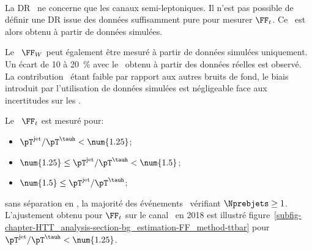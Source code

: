 \paragraph{\ttbar}
La DR \ttbar\ ne concerne que les canaux semi-leptoniques.
Il n'est pas possible de définir une DR issue des données suffisamment pure pour mesurer $\FF_t$.
Ce \fakefactor\ est alors obtenu à partir de données simulées.
\par
Le \fakefactor\ $\FF_W$ peut également être mesuré à partir de données simulées uniquement.
Un écart de \num{10} à \SI{20}{\%} avec le \fakefactor\ obtenu à partir des données réelles est observé.
La contribution \ttbar\ étant faible par rapport aux autres bruits de fond, le biais introduit par l'utilisation de données simulées est négligeable face aux incertitudes sur les \fakefactors.
\par
Le \fakefactor\ $\FF_t$ est mesuré pour:
\begin{itemize}
\item $\pT^\text{jet}/\pT^{\tauh} < \num{1.25}$;
\item $\num{1.25} \leq \pT^\text{jet}/\pT^{\tauh} < \num{1.5}$;
\item $\num{1.5} \leq \pT^\text{jet}/\pT^{\tauh}$;
\end{itemize}
sans séparation en \Nprebjets, la majorité des événements \ttbar\ vérifiant $\Nprebjets\geq1$.
L'ajustement obtenu pour $\FF_t$ sur le canal \mu\tauh\ en 2018 est illustré figure~\ref{subfig-chapter-HTT_analysis-section-bg_estimation-FF_method-ttbar} pour $\pT^\text{jet}/\pT^{\tauh} < \num{1.25}$.

